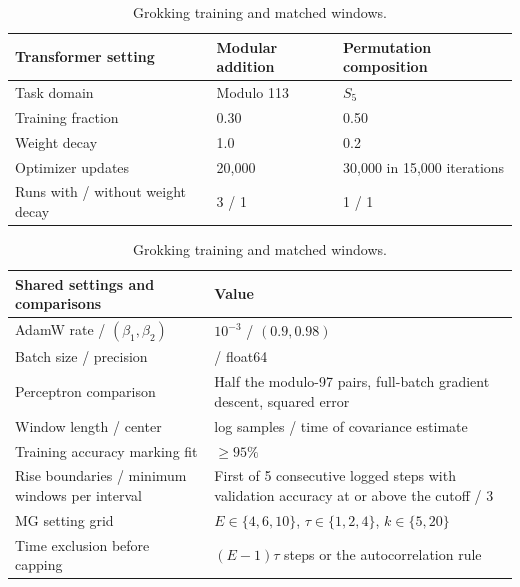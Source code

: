 \begin{table}[htbp]
\centering\small
\caption{Grokking training and matched windows.}
\label{tab:grokking-protocol}
\begin{tabularx}{\linewidth}{@{}>{\raggedright\arraybackslash}Xll@{}}
\toprule
Transformer setting & Modular addition & Permutation composition \\
\midrule
Task domain & Modulo 113 & $S_5$ \\
Training fraction & 0.30 & 0.50 \\
Weight decay & 1.0 & 0.2 \\
Optimizer updates & 20,000 & 30,000 in 15,000 iterations \\
Runs with / without weight decay & 3 / 1 & 1 / 1 \\
\bottomrule
\end{tabularx}\par\smallskip
\begin{tabularx}{\linewidth}{@{}>{\raggedright\arraybackslash}p{.31\linewidth}>{\raggedright\arraybackslash}X@{}}
\toprule
Shared settings and comparisons & Value \\
\midrule
AdamW rate / $(\beta_1,\beta_2)$ & $10^{-3}$ / $(0.9,0.98)$ \\
Batch size / precision & 256 / float64 \\
Perceptron comparison & Half the modulo-97 pairs, full-batch gradient descent, squared error \\
Window length / center & 60 log samples / time of covariance estimate \\
Training accuracy marking fit & $\ge95\%$ \\
Rise boundaries / minimum windows per interval & First of 5 consecutive logged steps with validation accuracy at or above the cutoff / 3 \\
MG setting grid & $E\in\{4,6,10\}$, $\tau\in\{1,2,4\}$, $k\in\{5,20\}$ \\
Time exclusion before capping & $(E-1)\tau$ steps or the autocorrelation rule \\
\bottomrule
\end{tabularx}
\end{table}
